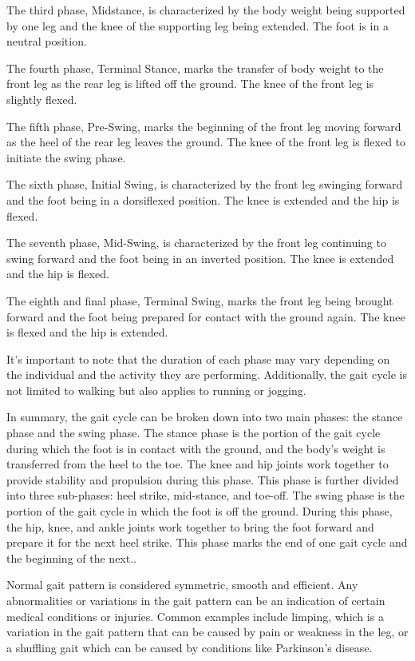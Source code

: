 The third phase, Midstance, is characterized by the body weight being supported by one leg and the knee of the supporting leg being extended. The foot is in a neutral position.

The fourth phase, Terminal Stance, marks the transfer of body weight to the front leg as the rear leg is lifted off the ground. The knee of the front leg is slightly flexed.

The fifth phase, Pre-Swing, marks the beginning of the front leg moving forward as the heel of the rear leg leaves the ground. The knee of the front leg is flexed to initiate the swing phase.

The sixth phase, Initial Swing, is characterized by the front leg swinging forward and the foot being in a dorsiflexed position. The knee is extended and the hip is flexed.

The seventh phase, Mid-Swing, is characterized by the front leg continuing to swing forward and the foot being in an inverted position. The knee is extended and the hip is flexed.

The eighth and final phase, Terminal Swing, marks the front leg being brought forward and the foot being prepared for contact with the ground again. The knee is flexed and the hip is extended.

It's important to note that the duration of each phase may vary depending on the individual and the activity they are performing. Additionally, the gait cycle is not limited to walking but also applies to running or jogging. \cite{Ludwig:2022} 

In summary, the gait cycle can be broken down into two main phases: the stance phase and the swing phase. The stance phase is the portion of the gait cycle during which the foot is in contact with the ground, and the body's weight is transferred from the heel to the toe. The knee and hip joints work together to provide stability and propulsion during this phase. This phase is further divided into three sub-phases: heel strike, mid-stance, and toe-off.
The swing phase is the portion of the gait cycle in which the foot is off the ground. During this phase, the hip, knee, and ankle joints work together to bring the foot forward and prepare it for the next heel strike. This phase marks the end of one gait cycle and the beginning of the next.. \cite{AbhayasingheMurray:2014} 

Normal gait pattern is considered symmetric, smooth and efficient. Any abnormalities or variations in the gait pattern can be an indication of certain medical conditions or injuries. Common examples include limping, which is a variation in the gait pattern that can be caused by pain or weakness in the leg, or a shuffling gait which can be caused by conditions like Parkinson's disease. 
